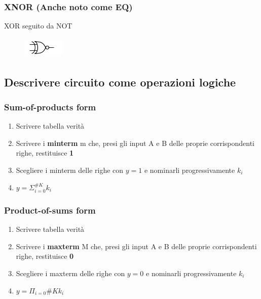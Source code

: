 \documentclass{report}
\begin{document}
        \subsubsection{XNOR (Anche noto come EQ)}
            XOR seguito da NOT
            \begin{center}
                \begin{figure}[H]
                    \includegraphics[width=2cm,height=1cm]{xnor.png}
                \end{figure}
            \end{center}
    \subsection{Descrivere circuito come operazioni logiche}
        \subsubsection{Sum-of-products form}
        \begin{enumerate}
            \item Scrivere tabella verità
            \item Scrivere i \textbf{minterm} m che, presi gli input A e B delle
              proprie corrispondenti righe, restituisce \textbf{1}
            \item Scegliere i minterm delle righe con $y=1$ e nominarli progressivamente $k_i$
            \item $y = \Sigma_{i=0}^{\#K}k_i$
        \end{enumerate}
        \subsubsection{Product-of-sums form}
        \begin{enumerate}
            \item Scrivere tabella verità
            \item Scrivere i \textbf{maxterm} M che, presi gli input A e B delle
            proprie corrispondenti righe, restituisce \textbf{0}
            \item Scegliere i maxterm delle righe con $y=0$ e nominarli progressivamente $k_i$
            \item $y = \Pi_{i=0}{\#K}k_i$
        \end{enumerate}
\end{document}
